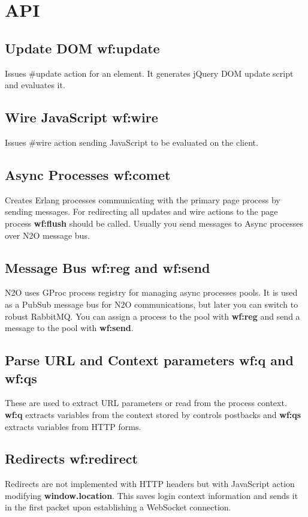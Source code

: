 \section{API}

\subsection{Update DOM \bf{wf:update}}
Issues \#update{} action for an element.
It generates jQuery DOM update script and evaluates it.

\subsection{Wire JavaScript \bf{wf:wire}}
Issues \#wire{} action sending JavaScript to be evaluated on the client.

\subsection{Async Processes \bf{wf:comet}}
Creates Erlang processes communicating with the primary page process by sending messages.
For redirecting all updates and wire actions to the page process {\bf wf:flush} should be called.
Usually you send messages to Async processes over N2O message bus.

\subsection{Message Bus {\bf wf:reg} and {\bf wf:send}}
N2O uses GProc process registry for managing async processes pools.
It is used as a PubSub message bus for N2O communications, but later you can switch to robust RabbitMQ.
You can assign a process to the pool with {\bf wf:reg} and send a message to the pool with {\bf wf:send}.

\subsection{Parse URL and Context parameters {\bf wf:q} and {\bf wf:qs}}
These are used to extract URL parameters or read from the process context. {\bf wf:q} extracts variables
from the context stored by controls postbacks and {\bf wf:qs} extracts variables from HTTP forms.

\subsection{Redirects {\bf wf:redirect}}
Redirects are not implemented with HTTP headers but with JavaScript action modifying {\bf window.location}.
This saves login context information and sends it in the first packet upon establishing a WebSocket connection.

